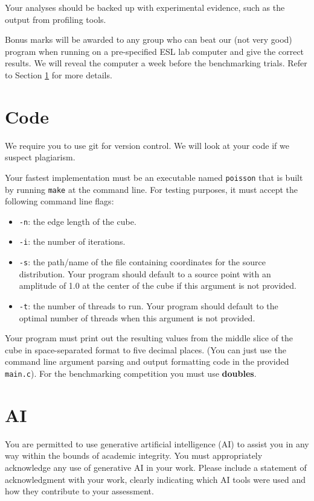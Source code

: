 \documentclass[a4paper,11pt]{article}
\newcommand{\code}[1]{\texttt{#1}}
\begin{document}
Your analyses should be backed up with experimental evidence, such as
the output from profiling tools.

Bonus marks will be awarded to any group who can beat our (not
very good) program when running on a pre-specified ESL lab computer
and give the correct results.  We will reveal the computer a week
before the benchmarking trials.  Refer to Section \ref{code} for 
more details.

\section{Code} \label{code}

We require you to use git for version control.  We will look at your
code if we suspect plagiarism.

Your fastest implementation must be an executable named \code{poisson}
that is built by running \code{make} at the command line.  For testing
purposes, it must accept the following command line flags:
\begin{itemize}
  \item \code{-n}: the edge length of the cube.
  \item \code{-i}: the number of iterations.
  \item \code{-s}: the path/name of the file containing coordinates 
  for the source distribution. Your program should default to a source
  point with an amplitude of 1.0 at the center of the cube if this argument 
  is not provided.
  \item \code{-t}: the number of threads to run. Your program should default 
  to the optimal number of threads when this argument is not provided.
\end{itemize}
Your program must print out the resulting values from the middle slice of the
cube in space-separated format to five decimal places.  (You can just
use the command line argument parsing and output formatting code in
the provided \code{main.c}). For the benchmarking competition you must
use \textbf{doubles}.


\section{AI}

You are permitted to use generative artificial intelligence (AI) to
assist you in any way within the bounds of academic integrity. You
must appropriately acknowledge any use of generative AI in your
work. Please include a statement of acknowledgment with your work,
clearly indicating which AI tools were used and how they contribute to
your assessment.
\end{document}
